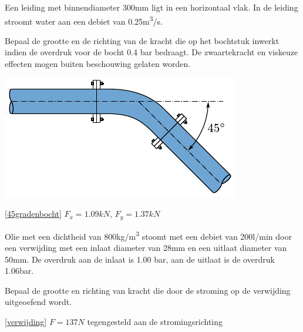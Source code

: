 \begin{toepassing}[*]
	\label{45gradenbocht}
Een leiding met binnendiameter 300mm ligt in een horizontaal vlak. In de leiding stroomt water aan een debiet van 0.25\unit{m^3/s}.    

Bepaal de grootte en de richting van de kracht die op het bochtstuk inwerkt indien de overdruk voor de bocht 0.4 bar bedraagt. De zwaartekracht en viskeuze effecten mogen buiten beschouwing gelaten worden.

	\centering
	\includegraphics{fig/behoudsvergelijkingen/45gradenbocht}
\end{toepassing}
\begin{antwoord}{\ref{45gradenbocht}}
	$F_x = 1.09\unit{kN}$, $F_y = 1.37\unit{kN}$
\end{antwoord}
\begin{toepassing}[*]
	\label{verwijding}
Olie met een dichtheid van 800\unit{kg/m^3} stoomt met een debiet van 200l/min door een verwijding met een inlaat diameter van 28mm en een uitlaat diameter van 50mm. De overdruk aan de inlaat is 1.00 bar, aan de uitlaat is de overdruk 1.06bar.

Bepaal de grootte en richting van kracht die door de stroming op de verwijding uitgeoefend wordt.
\end{toepassing}
\begin{antwoord}{\ref{verwijding}}
	$F = 137\unit{N}$ tegengesteld aan de stromingsrichting
\end{antwoord}
